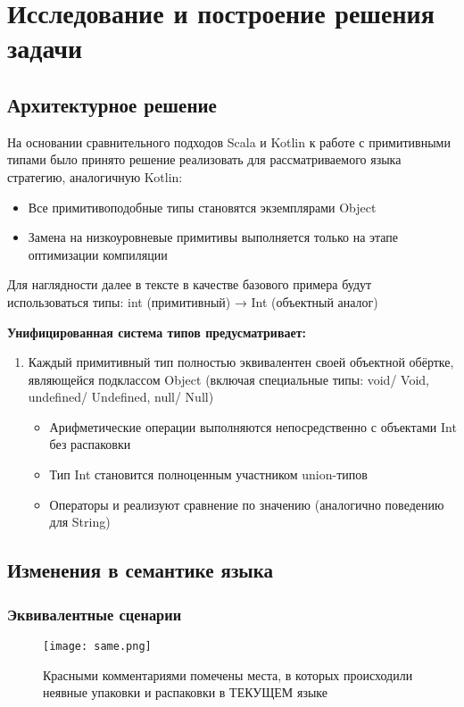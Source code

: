 \section{Исследование и построение решения задачи}
\label{sec:Chapter3} 




\subsection{Архитектурное решение}
На основании сравнительного подходов Scala и Kotlin к работе с примитивными типами было принято решение реализовать для рассматриваемого языка стратегию, аналогичную Kotlin:
\begin{itemize}[label={--}]
    \item Все примитивоподобные типы становятся экземплярами Object
    \item Замена на низкоуровневые примитивы выполняется только на этапе оптимизации компиляции
\end{itemize}

Для наглядности далее в тексте в качестве базового примера будут использоваться типы:
int (примитивный) → Int (объектный аналог)

\textbf{Унифицированная система типов предусматривает:}
\begin{enumerate}
    \item Каждый примитивный тип полностью эквивалентен своей объектной обёртке, являющейся подклассом Object
    (включая специальные типы: void/ Void, undefined/ Undefined, null/ Null)
    \begin{itemize}[label={--}]
        \item Арифметические операции выполняются непосредственно с объектами Int без распаковки
        \item Тип Int становится полноценным участником union-типов
        \item Операторы \code{==} и \code{===} реализуют сравнение по значению (аналогично поведению для String)
    \end{itemize}

\end{enumerate}

\newpage
\subsection{Изменения в семантике языка}

\subsubsection{Эквивалентные сценарии}
\begin{figure}[H] %
    \centering
    \texttt{[image: same.png]}
    \caption{Красными комментариями помечены места, в которых происходили неявные упаковки и распаковки в ТЕКУЩЕМ языке}
    \label{fig:example}
\end{figure}

